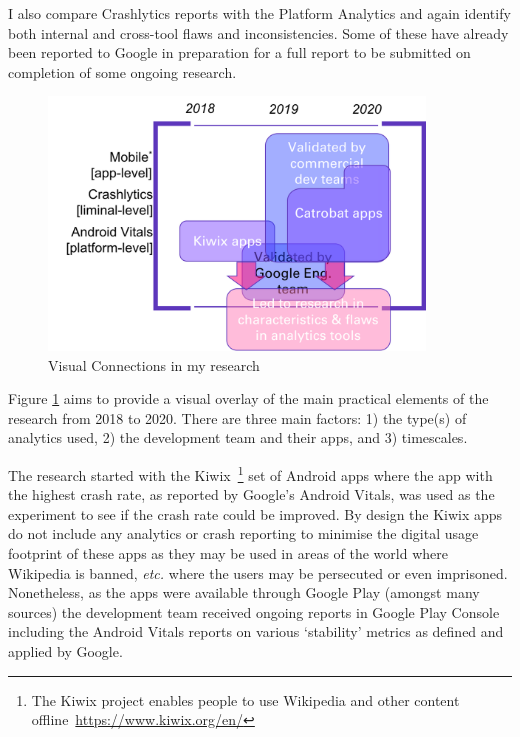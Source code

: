 
I also compare Crashlytics reports with the Platform Analytics and again identify both internal and cross-tool flaws and inconsistencies. Some of these have already been reported to Google in preparation for a full report to be submitted on completion of some ongoing research.

\begin{figure}[ht]
    \centering
    \includegraphics[width=10cm]{images/visual-connections-in-research.png}
    \caption{Visual Connections in my research}
    \label{fig:visual-connections-in-research}
\end{figure}

Figure \ref{fig:visual-connections-in-research}  aims to provide a visual overlay of the main practical elements of the research from 2018 to 2020. There are three main factors: 1) the type(s) of analytics used, 2) the development team and their apps, and 3) timescales.

The research started with the Kiwix~\footnote{The Kiwix project enables people to use Wikipedia and other content offline~\url{https://www.kiwix.org/en/}} set of Android apps where the app with the highest crash rate, as reported by Google's Android Vitals, was used as the experiment to see if the crash rate could be improved. By design the Kiwix apps do not include any analytics or crash reporting to minimise the digital usage footprint of these apps as they may be used in areas of the world where Wikipedia is banned, \emph{etc.} where the users may be persecuted or even imprisoned. Nonetheless, as the apps were available through Google Play (amongst many sources) the development team received ongoing reports in Google Play Console including the Android Vitals reports on various `stability' metrics as defined and applied by Google. 

